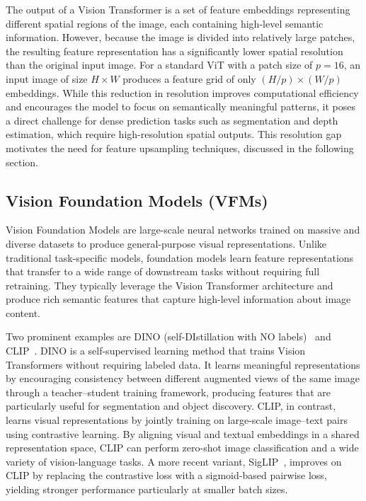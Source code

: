 The output of a Vision Transformer is a set of feature
embeddings representing different spatial regions of the image,
each containing high-level semantic information.
However, because the image is divided into relatively large
patches, the resulting feature representation has a
significantly lower spatial resolution than the original input
image.
For a standard ViT with a patch size of $p = 16$, an input
image of size $H \times W$ produces a feature grid of only
$(H/p) \times (W/p)$ embeddings.
While this reduction in resolution improves computational
efficiency and encourages the model to focus on semantically
meaningful patterns, it poses a direct challenge for
dense prediction tasks such as segmentation and depth
estimation, which require high-resolution spatial outputs.
This resolution gap motivates the need for feature upsampling
techniques, discussed in the following section.

\subsection{Vision Foundation Models (VFMs)}

Vision Foundation Models are large-scale neural networks trained
on massive and diverse datasets to produce general-purpose
visual representations.
Unlike traditional task-specific models, foundation models learn
feature representations that transfer to a wide range of
downstream tasks without requiring full retraining.
They typically leverage the Vision Transformer architecture and
produce rich semantic features that capture high-level
information about image content.

Two prominent examples are DINO (self-DIstillation with NO labels)~\cite{caron2021dino} and CLIP~\cite{radford2021clip}\@.
DINO is a self-supervised learning method that trains Vision
Transformers without requiring labeled data.
It learns meaningful representations by encouraging consistency
between different augmented views of the same image through a
teacher--student training framework, producing features that are
particularly useful for segmentation and object discovery.
CLIP, in contrast, learns visual representations by jointly
training on large-scale image--text pairs using contrastive
learning.
By aligning visual and textual embeddings in a shared
representation space, CLIP can perform zero-shot image
classification and a wide variety of vision-language tasks.
A more recent variant, SigLIP~\cite{zhai2023siglip}, improves on CLIP by replacing
the contrastive loss with a sigmoid-based pairwise loss,
yielding stronger performance particularly at smaller batch
sizes.

